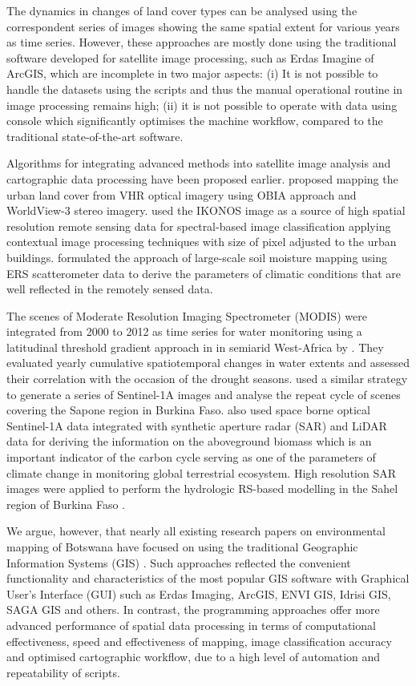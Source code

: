 \documentclass[atmosphere,article,submit,pdftex,moreauthors]{Definitions/mdpi}
\begin{document}
The dynamics in changes of land cover types can be analysed using the correspondent series of images showing the same spatial extent for various years as time series. However, these approaches are mostly done using the traditional software developed for satellite image processing, such as Erdas Imagine of ArcGIS, which are incomplete in two major aspects: (i) It is not possible to handle the datasets using the scripts and thus the manual operational routine in image processing remains high; (ii) it is not possible to operate with data using console which significantly optimises the machine workflow, compared to the traditional state-of-the-art software. 

Algorithms for integrating advanced methods into satellite image analysis and cartographic data processing have been proposed earlier. \cite{7924570} proposed mapping the urban land cover from VHR optical imagery using OBIA approach and WorldView-3 stereo imagery. \cite{985893} used the IKONOS image as a source of high spatial resolution remote sensing data for spectral-based image classification applying contextual image processing techniques with size of pixel adjusted to the urban buildings. \cite{851761} formulated the approach of large-scale soil moisture mapping using ERS scatterometer data to derive the parameters of climatic conditions that are well reflected in the remotely sensed data. 

The scenes of Moderate Resolution Imaging Spectrometer (MODIS) were integrated from 2000 to 2012 as time series for water monitoring using a latitudinal threshold gradient approach in in semiarid West-Africa by \cite{6875901}. They evaluated yearly cumulative spatiotemporal changes in water extents and assessed their correlation with the occasion of the drought seasons. \cite{8898897} used a similar strategy to generate a series of Sentinel-1A images and analyse the repeat cycle of scenes covering the Sapone region in Burkina Faso. \cite{s23010349} also used space borne optical Sentinel-1A data integrated with synthetic aperture radar (SAR) and LiDAR data for deriving the information on the aboveground biomass which is an important indicator of the carbon cycle serving as one of the parameters of climate change in monitoring global terrestrial ecosystem. High resolution SAR images were applied to perform the hydrologic RS-based modelling in the Sahel region of Burkina Faso \cite{6103630}.

We argue, however, that nearly all existing research papers on environmental mapping of Botswana have focused on using the traditional Geographic Information Systems (GIS) \cite{Augusseau,AFR350,hydrology9010012,land7040124,ZOUNGRANA201866,cecchi2008towards,Forkuor}. Such approaches reflected the convenient functionality and characteristics of the most popular GIS software with Graphical User's Interface (GUI) such as Erdas Imaging, ArcGIS, ENVI GIS, Idrisi GIS, SAGA GIS and others. In contrast, the programming approaches offer more advanced performance of spatial data processing in terms of computational effectiveness, speed and effectiveness of mapping, image classification accuracy and optimised cartographic workflow, due to a high level of automation and repeatability of scripts.
\end{document}

